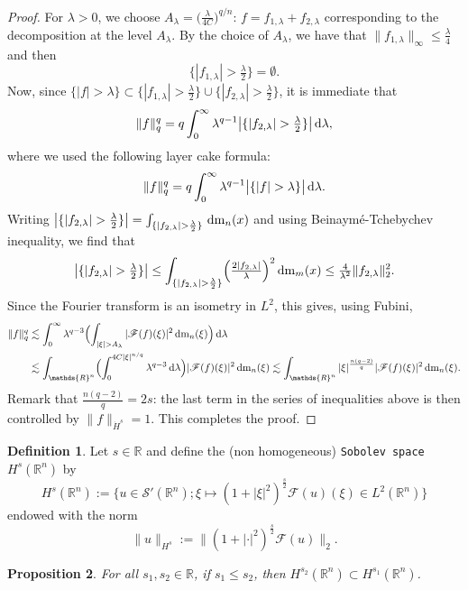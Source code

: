 \documentclass[a4paper, 12pt]{article}
\theoremstyle{plain}
\newtheorem{proposition}{Proposition}[section]
\theoremstyle{definition}
\newtheorem{definition}[proposition]{Definition}
\theoremstyle{remark}
\numberwithin{equation}{section}
\begin{document}
\begin{proof}
For $\lambda>0$, we choose $A_\lambda=\bigl(\frac{\lambda}{4C}\bigr)^{q/n}$:
$f=f_{1,\lambda}+f_{2,\lambda}$ corresponding to the decomposition at the level $A_\lambda$. By the choice of $A_\lambda$,
we have that $\|f_{1,\lambda}\|_\infty\le \frac{\lambda}{4}$ and then
\[
\bigl\{|f_{1,\lambda}|>\tfrac{\lambda}{2}\bigr\}=\emptyset.
\]
Now, since $\bigl\{|f|>\lambda\bigr\}\subset \bigl\{|f_{1,\lambda}|>\tfrac{\lambda}{2}\bigr\}\cup \bigl\{|f_{2,\lambda}|>\tfrac{\lambda}{2}\bigr\}$, 
it is immediate that
\[
\|f\|_q^q=q\int_0^\infty\lambda^{q-1}\bigl|\{|f_{2,\lambda}|>\tfrac{\lambda}{2}\}\bigr|\,{\rm d}\lambda,
\]
where we used the following layer cake formula:
\[
\|f\|_q^q=q\int_0^\infty\lambda^{q-1}\bigl|\{|f|>\lambda\}\bigr|\,{\rm d}\lambda.
\]
Writing $\bigl|\{|f_{2,\lambda}|>\tfrac{\lambda}{2}\}\bigr| =\int_{\{|f_{2,\lambda}|>\frac{\lambda}{2}\}}\,{\rm dm}_n(x)$ and using
Beinaym\'e-Tchebychev inequality, we find that
\[
\bigl|\{|f_{2,\lambda}|>\tfrac{\lambda}{2}\}\bigr| 
\le \int_{\{|f_{2,\lambda}|>\frac{\lambda}{2}\}}\Bigl(\tfrac{2|f_{2,\lambda}|}{\lambda}\Bigr)^2\,{\rm dm}_m(x)
\le \tfrac{4}{\lambda^2}\|f_{2,\lambda}\|_2^2.
\]
Since the Fourier transform is an isometry in $L^2$, this gives, using Fubini,
%
\begin{align*}
\|f\|_q^q&\lesssim \int_0^\infty \lambda^{q-3}\Bigl(\int_{|\xi|>A_\lambda}|{\mathscr{F}}(f)(\xi)|^2\,{\rm dm}_n(\xi) \Bigr)\,{\rm d}\lambda \\
&\lesssim \int_{{\mathds{R}}^n}\Bigl(\int_0^{4C|\xi|^{n/q}}\lambda^{q-3}\,{\rm d}\lambda\Bigr)|{\mathscr{F}}(f)(\xi)|^2\,{\rm dm}_n(\xi)
\lesssim \int_{{\mathds{R}}^n} |\xi|^{\frac{n(q-2)}{q}}|{\mathscr{F}}(f)(\xi)|^2\,{\rm dm}_n(\xi).
\end{align*}
% 
Remark that $\frac{n(q-2)}{q}=2s$: the last term in the series of inequalities above is then controlled by $\|f\|_{\dot H^s}=1$. 
This completes the proof.
\end{proof}

\begin{definition}
\label{def:sobolev}
Let $s\in {\mathds{R}}$ and define the (non homogeneous) {\tt Sobolev space} $H^s({\mathds{R}}^n)$ by 
\[
H^s({\mathds{R}}^n):=\bigl\{u\in{\mathscr{S}}'({\mathds{R}}^n);\xi\mapsto (1+|\xi|^2)^{\frac{s}{2}}{\mathscr{F}}(u)(\xi)\in L^2({\mathds{R}}^n)\bigr\}
\]
endowed with the norm
\[
\|u\|_{H^s}:= \bigl\|(1+|\cdot|^2)^{\frac{s}{2}}{\mathscr{F}}(u)\|_2.
\]
\end{definition}

\begin{proposition}
For all $s_1,s_2\in{\mathds{R}}$, if $s_1\le s_2$, then $H^{s_2}({\mathds{R}}^n)\subset H^{s_1}({\mathds{R}}^n)$.
\end{proposition}
\end{document}
